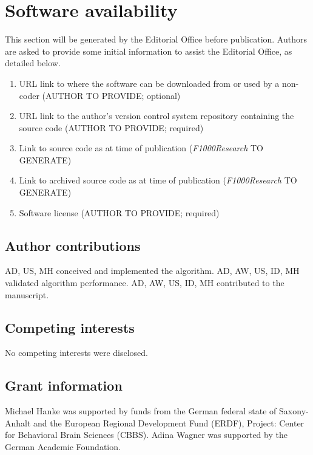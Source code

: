 \documentclass[10pt,a4paper]{extarticle}
\begin{document}
\section*{Software availability}
This section will be generated by the Editorial Office before publication. Authors are asked to provide some initial information to assist the Editorial Office, as detailed below.
\begin{enumerate}
\item URL link to where the software can be downloaded from or used by a non-coder (AUTHOR TO PROVIDE; optional)
\item URL link to the author's version control system repository containing the source code (AUTHOR TO PROVIDE; required)
\item Link to source code as at time of publication ({\textit{F1000Research}} TO GENERATE)
\item Link to archived source code as at time of publication ({\textit{F1000Research}} TO GENERATE)
\item Software license (AUTHOR TO PROVIDE; required)
\end{enumerate}


\subsection*{Author contributions}
AD, US, MH conceived and implemented the algorithm.
AD, AW, US, ID, MH validated algorithm performance.
AD, AW, US, ID, MH contributed to the manuscript.

\subsection*{Competing interests}
No competing interests were disclosed.

\subsection*{Grant information}
Michael Hanke was supported by funds from the German federal state of
Saxony-Anhalt and the European Regional Development Fund (ERDF), 
Project: Center for Behavioral Brain Sciences (CBBS).
Adina Wagner was supported by the German Academic Foundation.
\end{document}

